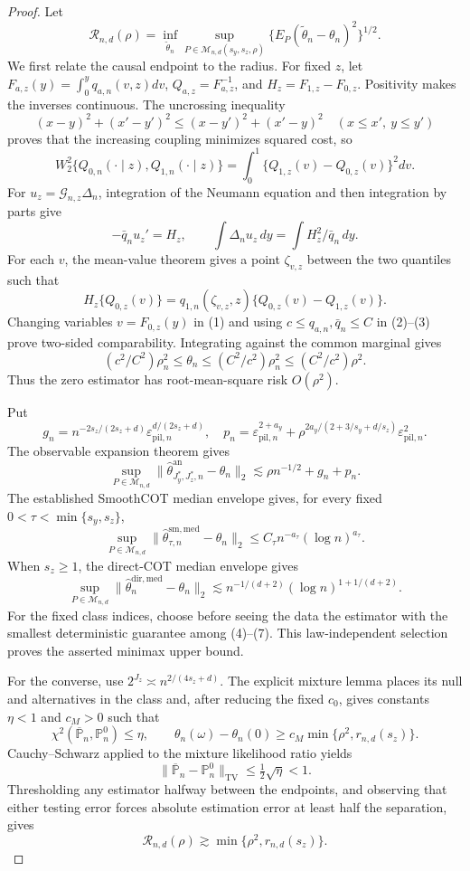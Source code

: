 \documentclass{article}
\begin{document}
\begin{proof}
Let
\[
\mathcal R_{n,d}(\rho)=\inf_{\widetilde\theta_n}
\sup_{P\in\mathcal M_{n,d}(s_y,s_z,\rho)}
\{E_P(\widetilde\theta_n-\theta_n)^2\}^{1/2}.
\]
We first relate the causal endpoint to the radius.  For fixed \(z\), let \(F_{a,z}(y)=\int_0^yq_{a,n}(v,z)dv\), \(Q_{a,z}=F_{a,z}^{-1}\), and \(H_z=F_{1,z}-F_{0,z}\).  Positivity makes the inverses continuous.  The uncrossing inequality
\[
(x-y)^2+(x'-y')^2\le(x-y')^2+(x'-y)^2
\quad(x\le x',\ y\le y')
\]
proves that the increasing coupling minimizes squared cost, so
\[
W_2^2\{Q_{0,n}(\cdot\mid z),Q_{1,n}(\cdot\mid z)\}
=\int_0^1\{Q_{1,z}(v)-Q_{0,z}(v)\}^2dv. \tag{1}
\]
For \(u_z=\mathcal G_{n,z}\Delta_n\), integration of the Neumann equation and then integration by parts give
\[
-\bar q_nu_z'=H_z,
\qquad
\int\Delta_nu_z\,dy=\int H_z^2/\bar q_n\,dy. \tag{2}
\]
For each \(v\), the mean-value theorem gives a point \(\zeta_{v,z}\) between the two quantiles such that
\[
H_z\{Q_{0,z}(v)\}=q_{1,n}(\zeta_{v,z},z)
\{Q_{0,z}(v)-Q_{1,z}(v)\}. \tag{3}
\]
Changing variables \(v=F_{0,z}(y)\) in (1) and using \(c\le q_{a,n},\bar q_n\le C\) in (2)--(3) prove two-sided comparability.  Integrating against the common marginal gives
\[
(c^2/C^2)\rho_n^2\le\theta_n\le(C^2/c^2)\rho_n^2
\le(C^2/c^2)\rho^2. \tag{4}
\]
Thus the zero estimator has root-mean-square risk \(O(\rho^2)\).

Put
\[
g_n=n^{-2s_z/(2s_z+d)}\varepsilon_{\mathrm{pil},n}^{d/(2s_z+d)},
\quad
p_n=\varepsilon_{\mathrm{pil},n}^{2+a_y}
+\rho^{2a_y/(2+3/s_y+d/s_z)}\varepsilon_{\mathrm{pil},n}^2.
\]
The observable expansion theorem gives
\[
\sup_{P\in\mathcal M_{n,d}}
\|\widehat\theta^{\mathrm{an}}_{J_y^*,J_z^*,n}-\theta_n\|_2
\lesssim\rho n^{-1/2}+g_n+p_n. \tag{5}
\]
The established SmoothCOT median envelope gives, for every fixed \(0<\tau<\min\{s_y,s_z\}\),
\[
\sup_{P\in\mathcal M_{n,d}}
\|\widehat\theta^{\mathrm{sm,med}}_{\tau,n}-\theta_n\|_2
\le C_\tau n^{-a_\tau}(\log n)^{a_\tau}. \tag{6}
\]
When \(s_z\ge1\), the direct-COT median envelope gives
\[
\sup_{P\in\mathcal M_{n,d}}
\|\widehat\theta_n^{\mathrm{dir,med}}-\theta_n\|_2
\lesssim n^{-1/(d+2)}(\log n)^{1+1/(d+2)}. \tag{7}
\]
For the fixed class indices, choose before seeing the data the estimator with the smallest deterministic guarantee among (4)--(7).  This law-independent selection proves the asserted minimax upper bound.

For the converse, use \(2^{J_z}\asymp n^{2/(4s_z+d)}\).  The explicit mixture lemma places its null and alternatives in the class and, after reducing the fixed \(c_0\), gives constants \(\eta<1\) and \(c_M>0\) such that
\[
\chi^2(\overline{\mathbb P}_n,\mathbb P_n^0)\le\eta,
\qquad
\theta_n(\omega)-\theta_n(0)
\ge c_M\min\{\rho^2,r_{n,d}(s_z)\}. \tag{8}
\]
Cauchy--Schwarz applied to the mixture likelihood ratio yields
\[
\|\overline{\mathbb P}_n-\mathbb P_n^0\|_{\mathrm{TV}}
\le\tfrac12\sqrt\eta<1. \tag{9}
\]
Thresholding any estimator halfway between the endpoints, and observing that either testing error forces absolute estimation error at least half the separation, gives
\[
\mathcal R_{n,d}(\rho)\gtrsim\min\{\rho^2,r_{n,d}(s_z)\}. \tag{10}
\]


\end{proof}
\end{document}
